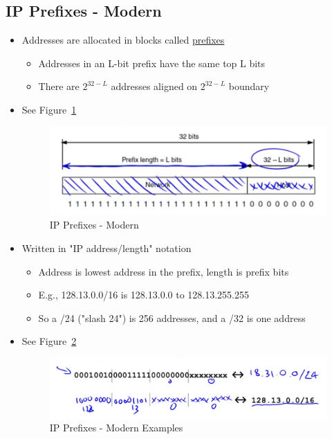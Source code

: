 \documentclass[12pt]{ctexart}   %
\begin{document}
	\subsection{IP Prefixes - Modern}
	\begin{itemize}
		\item Addresses are allocated in blocks called \underline{prefixes}
		\begin{itemize}
			\item Addresses in an L-bit prefix have the same top L bits
			\item There are $2^{32-L}$ addresses aligned on $2^{32-L}$ boundary
		\end{itemize}
		\item See Figure~\ref{fig:4-4-3}
		
		\begin{figure}[h!] %
		\centering
		 \includegraphics[scale=0.7]{images/4-4-3}
		\caption{IP Prefixes - Modern}
		 \label{fig:4-4-3}
		 \end{figure}
		 
		 \item Written in "IP address/length" notation
		 \begin{itemize}
		 	\item Address is lowest address in the prefix, length is prefix bits
		 	\item E.g., 128.13.0.0/16 is 128.13.0.0 to 128.13.255.255
		 	\item So a /24 ("slash 24") is 256 addresses, and a /32 is one address
		 \end{itemize}
		 \item See Figure~\ref{fig:4-4-4}
		
		\begin{figure}[h!] %
		\centering
		 \includegraphics[scale=0.7]{images/4-4-4}
		\caption{IP Prefixes - Modern Examples}
		 \label{fig:4-4-4}
		 \end{figure}
		 

\end{itemize}
\end{document}
